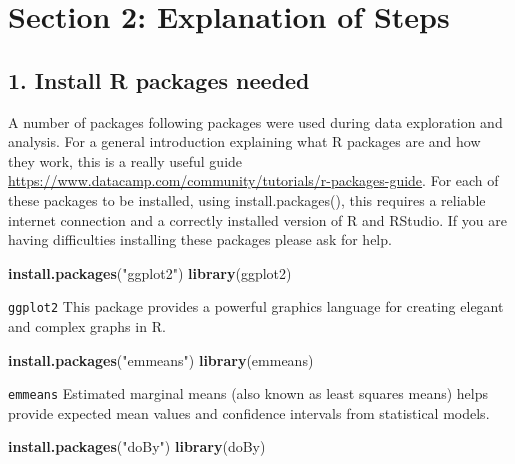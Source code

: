 \documentclass[]{book}
\newenvironment{Shaded}{\begin{snugshade}}{\end{snugshade}}
\newcommand{\KeywordTok}[1]{\textcolor[rgb]{0.13,0.29,0.53}{\textbf{#1}}}
\newcommand{\StringTok}[1]{\textcolor[rgb]{0.31,0.60,0.02}{#1}}
\newcommand{\NormalTok}[1]{#1}
\theoremstyle{definition}
\theoremstyle{definition}
\theoremstyle{definition}
\theoremstyle{remark}
\begin{document}
\section{Section 2: Explanation of
Steps}\label{section-2-explanation-of-steps-2}

\subsection{1. Install R packages
needed}\label{install-r-packages-needed-2}

A number of packages following packages were used during data
exploration and analysis. For a general introduction explaining what R
packages are and how they work, this is a really useful guide
\url{https://www.datacamp.com/community/tutorials/r-packages-guide}. For
each of these packages to be installed, using install.packages(), this
requires a reliable internet connection and a correctly installed
version of R and RStudio. If you are having difficulties installing
these packages please ask for help.

\begin{Shaded}
\begin{Highlighting}[]
\KeywordTok{install.packages}\NormalTok{(}\StringTok{"ggplot2"}\NormalTok{)}
\KeywordTok{library}\NormalTok{(ggplot2)}
\end{Highlighting}
\end{Shaded}

\texttt{ggplot2} This package provides a powerful graphics language for
creating elegant and complex graphs in R.

\begin{Shaded}
\begin{Highlighting}[]
\KeywordTok{install.packages}\NormalTok{(}\StringTok{"emmeans"}\NormalTok{)}
\KeywordTok{library}\NormalTok{(emmeans)}
\end{Highlighting}
\end{Shaded}

\texttt{emmeans} Estimated marginal means (also known as least squares
means) helps provide expected mean values and confidence intervals from
statistical models.

\begin{Shaded}
\begin{Highlighting}[]
\KeywordTok{install.packages}\NormalTok{(}\StringTok{"doBy"}\NormalTok{)}
\KeywordTok{library}\NormalTok{(doBy)}
\end{Highlighting}
\end{Shaded}
\end{document}
